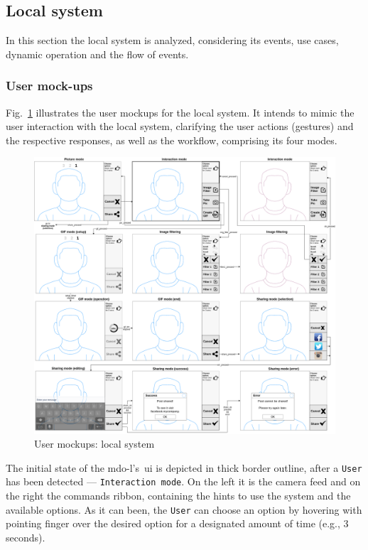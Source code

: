 %
\subsection{Local system}
\label{sec:local-system}
In this section the local system is analyzed, considering its events, use cases,
dynamic operation and the flow of events.
%
\subsubsection{User mock-ups}
\label{sec:user-mockups}
Fig.~\ref{fig:user-mockups-local} illustrates the user mockups for the local
system. It intends to mimic the user interaction with the local system,
clarifying the user actions (gestures) and the respective responses, as well as
the workflow, comprising its four modes.
%
\begin{figure}[htb!]
\centering
    \includegraphics[width=1.0\columnwidth]{./img/user-mockups-local.png}
  \caption{User mockups: local system}%
\label{fig:user-mockups-local}
\end{figure}

The initial state of the \gls{mdo-l}'s~\gls{ui} is depicted in thick border
outline, after a \texttt{User} has been detected --- \texttt{Interaction
  mode}. On the left it is the camera feed and on the right the commands ribbon,
containing the hints to use the system and the available options. As it can
been, the \texttt{User} can choose an option by hovering with pointing finger
over the desired option for a designated amount of time (e.g., 3 seconds).

